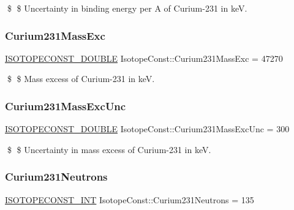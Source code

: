 \$ \$ Uncertainty in binding energy per A of Curium-\/231 in keV. \mbox{\label{group___isotope_const-_curium-_cm231_ga04befaaa2ceb25dce3a530a19bb582d5}} 
\subsubsection{\texorpdfstring{Curium231\+Mass\+Exc}{Curium231MassExc}}
{\footnotesize\ttfamily \mbox{\hyperlink{group___isotope_const-_macros_ga8f45a7272ce02c0b4c65c44636ed719a}{I\+S\+O\+T\+O\+P\+E\+C\+O\+N\+S\+T\+\_\+\+D\+O\+U\+B\+LE}} Isotope\+Const\+::\+Curium231\+Mass\+Exc = 47270}

\$ \$ Mass excess of Curium-\/231 in keV. \mbox{\label{group___isotope_const-_curium-_cm231_ga67aa4e15b242063b3f21f01ca001bbc3}} 
\subsubsection{\texorpdfstring{Curium231\+Mass\+Exc\+Unc}{Curium231MassExcUnc}}
{\footnotesize\ttfamily \mbox{\hyperlink{group___isotope_const-_macros_ga8f45a7272ce02c0b4c65c44636ed719a}{I\+S\+O\+T\+O\+P\+E\+C\+O\+N\+S\+T\+\_\+\+D\+O\+U\+B\+LE}} Isotope\+Const\+::\+Curium231\+Mass\+Exc\+Unc = 300}

\$ \$ Uncertainty in mass excess of Curium-\/231 in keV. \mbox{\label{group___isotope_const-_curium-_cm231_gaff4548ad711602de87e29683f9ea8a82}} 
\subsubsection{\texorpdfstring{Curium231\+Neutrons}{Curium231Neutrons}}
{\footnotesize\ttfamily \mbox{\hyperlink{group___isotope_const-_macros_ga5f18360b3e99483a35c32d789e62621c}{I\+S\+O\+T\+O\+P\+E\+C\+O\+N\+S\+T\+\_\+\+I\+NT}} Isotope\+Const\+::\+Curium231\+Neutrons = 135}

